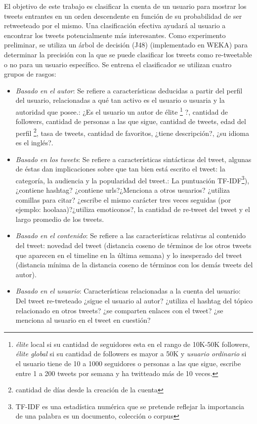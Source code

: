 El objetivo de este trabajo es clasificar la cuenta de un usuario para mostrar los tweets entrantes en un orden descendente en función de su probabilidad de ser retweeteado por el mismo. Una clasificación efectiva ayudará al usuario a encontrar los tweets potencialmente más interesantes. Como experimento preliminar, se utiliza un árbol de decisión (J48) (implementado en WEKA) para determinar la precisión con la que se puede clasificar los tweets como re-tweetable o no para un usuario específico. Se entrena el clasificador se utilizan cuatro grupos de rasgos:

\begin{itemize}
	\item \textit{Basado en el autor}: Se refiere a características deducidas a partir del perfil del usuario, relacionadas a qué tan activo es el usuario o usuaria y la autoridad que posee.: ¿Es el usuario un autor de élite \footnote{\emph{élite} local si su cantidad de seguidores esta en el rango de 10K-50K followers, \emph{élite global} si su cantidad de followers es mayor a 50K y \emph{usuario ordinario} si el usuario tiene de 10 a 1000 seguidores o personas a las que sigue, escribe entre 1 a 200 tweets por semana y ha twitteado más de 10 veces.} ?, cantidad de followers, cantidad de personas a las que sigue, cantidad de tweets,  edad del perfil \footnote{cantidad de días desde la creación de la cuenta}, tasa de tweets, cantidad de favoritos, ¿tiene descripción?, ¿su idioma es el inglés?. 
	
	\item \textit{Basado en los tweets}: Se refiere a características sintácticas del tweet, algunas de éstas dan implicaciones sobre que tan bien está escrito el tweet: la categoría, la audiencia y la popularidad del tweet.: La puntuación TF-IDF\footnote{TF-IDF es una estadística numérica que se pretende reflejar la importancia de una palabra es un documento, colección o corpus}), ¿contiene hashtag? ¿contiene urls?¿Menciona a otros usuarios? ¿utiliza comillas para citar? ¿escribe el mismo carácter tres veces seguidas (por ejemplo: hoolaaa)?¿utiliza emoticonos?, la cantidad de re-tweet del tweet y el largo promedio de los tweets.
	
	\item \textit{Basado en el contenido}: Se refiere a las características relativas al contenido del tweet: novedad del tweet (distancia coseno de términos de los otros tweets que aparecen en el timeline en la última semana) y lo inesperado del tweet (distancia mínima de la distancia coseno de términos con los demás tweets del autor).
	
	\item \textit{Basado en el usuario}: Características relacionadas a la cuenta del usuario: Del tweet re-tweteado ¿sigue el usuario al autor? ¿utiliza el hashtag del tópico relacionado en otros tweets? ¿se comparten enlaces con el tweet? ¿se menciona al usuario en el tweet en cuestión?
\end{itemize}

